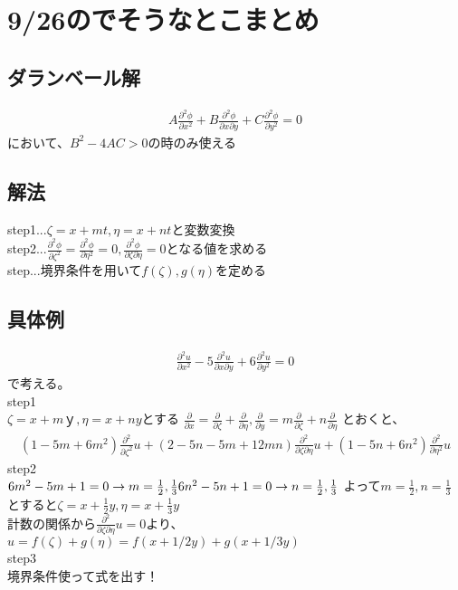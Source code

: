 \documentclass[titlepage,dvipdfmx]{jsarticle}
\begin{document}
\section{9/26のでそうなとこまとめ}
\subsection{ダランベール解}
\begin{eqnarray}
\displaystyle 
A\frac{\partial^2 \phi}{\partial x^2}+B\frac{\partial^2 \phi}{\partial x \partial y}+C\frac{\partial^2 \phi}{\partial y^2}=0 \nonumber
\end{eqnarray}
において、$B^2-4AC>0$の時のみ使える
\subsection{解法}
\noindent
step1...$\zeta=x+mt,\eta =x+nt $と変数変換\\
step2...$\frac{\partial^2 \phi}{\partial \zeta^2}=\frac{\partial^2 \phi}{\partial \eta^2}=0,\frac{\partial^2 \phi}{\partial \zeta \partial \eta} \!=0$となる値を求める\\
step...境界条件を用いて$f(\zeta),g(\eta)$を定める
\subsection{具体例}
\begin{eqnarray}
\displaystyle 
\frac{\partial^2 u}{\partial x^2}-5\frac{\partial^2 u}{\partial x \partial y}+6\frac{\partial^2 u}{\partial y^2}=0 \nonumber
\end{eqnarray}
で考える。\\
step1\\
$\zeta=x+mｙ,\eta=x+ny$とする
$\frac{\partial}{\partial x}=\frac{\partial}{\partial \zeta}+\frac{\partial}{\partial \eta},
\frac{\partial}{\partial y}=m\frac{\partial}{\partial \zeta}+n\frac{\partial}{\partial \eta}$
とおくと、\\
\begin{eqnarray}
\displaystyle
\left( 1-5m+6m^2 \right) \frac{\partial^2 }{\partial \zeta^2}u+\left( 2-5n-5m+12mn \right) \frac{\partial^2}{\partial \zeta \partial \eta}u+\left( 1-5n+6n^2\right) \frac{\partial^2 }{\partial \eta^2}u \nonumber
\end{eqnarray}
step2\\
$6m^2-5m+1=0 \rightarrow m=\frac{1}{2},\frac{1}{3}\\
 6n^2-5n+1=0 \rightarrow n=\frac{1}{2},\frac{1}{3}$
よって$m=\frac{1}{2},n=\frac{1}{3}$とすると$\zeta=x+\frac{1}{2}y,\eta=x+\frac{1}{3}y$\\
計数の関係から$\frac{\partial^2}{\partial \zeta \partial\eta}u=0$より、$u=f(\zeta)+g(\eta)=f(x+1/2y)+g(x+1/3y)$\\
step3 \\
境界条件使って式を出す！
\end{document}
